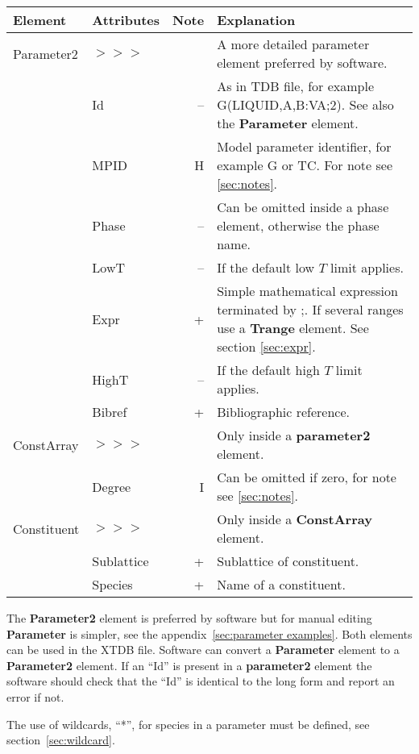 \documentclass{article}
\begin{document}
\bigskip
\begin{tabular}{|p{} p{} r p{}|}\hline
  Element & Attributes & Note & Explanation\\\hline

  Parameter2 &$>>>$&& A more detailed parameter element preferred by software.\\
      & Id & -- & As in TDB file, for example G(LIQUID,A,B:VA;2).  See also the {\bf Parameter} element. \\
      & MPID & H & Model parameter identifier, for example G or TC.  For note see \ref{sec:notes}.\\
      & Phase & -- & Can be omitted inside a phase element, otherwise the phase name.\\
      & LowT & -- & If the default low $T$ limit applies.\\
      & Expr & + & Simple mathematical expression terminated by ;.  If several ranges use a {\bf Trange} element.  See section \ref{sec:expr}.\\
      & HighT & -- & If the default high $T$ limit applies.\\
      & Bibref & + & Bibliographic reference.\\\hline

  ConstArray &$>>>$&& Only inside a {\bf parameter2} element.\\
      & Degree & I & Can be omitted if zero, for note see \ref{sec:notes}.\\\hline
  
  Constituent &$>>>$&& Only inside a {\bf ConstArray} element.\\
      & Sublattice & + &  Sublattice of constituent.\\
      & Species & + & Name of a constituent.\\\hline
\end{tabular}

\bigskip
The {\bf Parameter2} element is preferred by software but for manual
editing {\bf Parameter} is simpler, see the
appendix~\ref{sec:parameter examples}.  Both elements can be used in
the XTDB file.  Software can convert a {\bf Parameter} element to a
{\bf Parameter2} element.  If an ``Id'' is present in a {\bf
  parameter2} element the software should check that the ``Id'' is
identical to the long form and report an error if not.

The use of wildcards, ``*'', for species in a parameter must be
defined, see section~\ref{sec:wildcard}.
\end{document}

